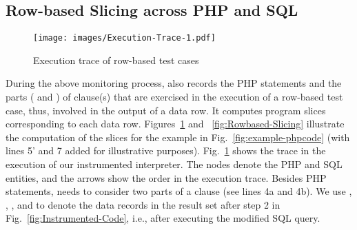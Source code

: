 \subsection{Row-based Slicing across PHP and SQL}

\begin{figure}[tbp]
  \centering
  \texttt{[image: images/Execution-Trace-1.pdf]}\\
  \caption{Execution trace of row-based test cases}\label{fig:Execution-Trace}
\end{figure}



During the above monitoring process, {\tool} also records the PHP
statements and the parts ( and ) of
 clause(s) that are exercised in the execution of a
row-based test case, thus, involved in the output of a data row. It
computes program slices corresponding to each data row.
Figures~\ref{fig:Execution-Trace} and ~\ref{fig:Rowbased-Slicing}
illustrate the computation of the slices for the example in
Fig.~\ref{fig:example-phpcode} (with lines 5' and 7 added for
illustrative purposes). Fig.~\ref{fig:Execution-Trace} shows the
trace in the execution of our instrumented interpreter. The
nodes denote the PHP and SQL entities, and the arrows show the order
in the execution trace. Besides PHP statements, {\tool} needs to
consider two parts of a  clause (see lines 4a and 4b).
We use , , , and
 to denote the data records in the result set 
after step 2 in Fig.~\ref{fig:Instrumented-Code}, i.e., after
executing the modified SQL query.

